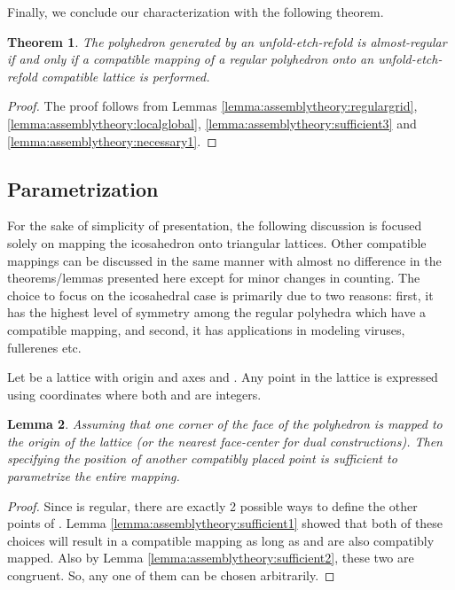 \documentclass[11pt]{article}
\newtheorem{thm}{Theorem}[section]
\newtheorem{lemma}[thm]{Lemma}
\newcommand{\1}{\mathds{1}}
\begin{document}
Finally, we conclude our characterization with the following theorem.

\begin{thm}
\label{thm:assemblytheory:characterization}
 The polyhedron generated by an unfold-etch-refold is \emph{almost-regular} if and only if a compatible mapping of a regular polyhedron onto an unfold-etch-refold compatible lattice is performed.
\end{thm}

\begin{proof}
The proof follows from Lemmas \ref{lemma:assemblytheory:regulargrid}, \ref{lemma:assemblytheory:localglobal}, \ref{lemma:assemblytheory:sufficient3} and \ref{lemma:assemblytheory:necessary1}.
\end{proof}


\subsection{Parametrization}
\label{sec:assemblytheory:combinatorics}
For the sake of simplicity of presentation, the following discussion is focused solely on mapping the icosahedron onto triangular lattices. Other compatible mappings can be discussed in the same manner with almost no difference in the theorems/lemmas presented here except for minor changes in counting. The choice to focus on the icosahedral case is primarily due to two reasons: first, it has the highest level of symmetry among the regular polyhedra which have a compatible mapping, and second, it has applications in modeling viruses, fullerenes etc. 

Let  be a lattice with origin  and axes  and . Any point in the lattice is expressed using coordinates  where both  and  are integers.

\begin{lemma}
 Assuming that one corner  of the face  of the polyhedron is mapped to the origin  of the lattice (or the nearest face-center for dual constructions). Then specifying the position of another compatibly placed point  is sufficient to parametrize the entire mapping. 
\end{lemma}

\begin{proof}
 Since  is regular, there are exactly 2 possible ways to define the other points of . Lemma \ref{lemma:assemblytheory:sufficient1} showed that both of these choices will result in a compatible mapping as long as  and  are also compatibly mapped. Also by Lemma \ref{lemma:assemblytheory:sufficient2}, these two are congruent. So, any one of them can be chosen arbitrarily.
\end{proof}
\end{document}
